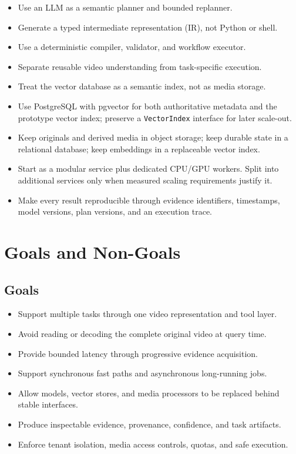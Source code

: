 \documentclass[11pt]{article}
\newcommand{\code}[1]{\texttt{#1}}
\begin{document}
\begin{itemize}
  \item Use an LLM as a semantic planner and bounded replanner.
  \item Generate a typed intermediate representation (IR), not Python or shell.
  \item Use a deterministic compiler, validator, and workflow executor.
  \item Separate reusable video understanding from task-specific execution.
  \item Treat the vector database as a semantic index, not as media storage.
  \item Use PostgreSQL with pgvector for both authoritative metadata and the
  prototype vector index; preserve a \code{VectorIndex} interface for later scale-out.
  \item Keep originals and derived media in object storage; keep durable state in
  a relational database; keep embeddings in a replaceable vector index.
  \item Start as a modular service plus dedicated CPU/GPU workers. Split into
  additional services only when measured scaling requirements justify it.
  \item Make every result reproducible through evidence identifiers, timestamps,
  model versions, plan versions, and an execution trace.
\end{itemize}

\section{Goals and Non-Goals}

\subsection{Goals}

\begin{itemize}
  \item Support multiple tasks through one video representation and tool layer.
  \item Avoid reading or decoding the complete original video at query time.
  \item Provide bounded latency through progressive evidence acquisition.
  \item Support synchronous fast paths and asynchronous long-running jobs.
  \item Allow models, vector stores, and media processors to be replaced behind
  stable interfaces.
  \item Produce inspectable evidence, provenance, confidence, and task artifacts.
  \item Enforce tenant isolation, media access controls, quotas, and safe execution.
\end{itemize}
\end{document}
